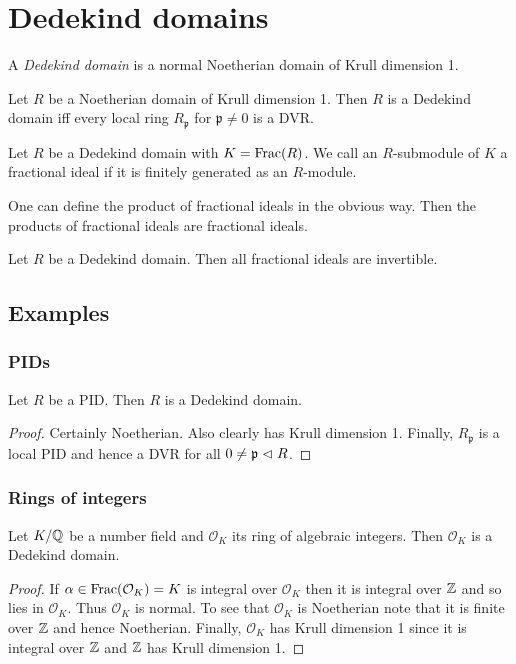 \documentclass{memoir}
\begin{document}
\section{Dedekind domains}
\begin{definition}
    A \textit{Dedekind domain} is a normal Noetherian domain of Krull dimension 1.
\end{definition}
\begin{lemma}
    Let $R$ be a Noetherian domain of Krull dimension 1.
    Then $R$ is a Dedekind domain iff every local ring $R_{\mathfrak p}$ for $\mathfrak p \ne 0$ is a DVR.
\end{lemma}
\begin{definition}
    Let $R$ be a Dedekind domain with $K=\text{Frac}(R)$.
    We call an $R$-submodule of $K$ a fractional ideal if it is finitely generated as an $R$-module.
\end{definition}
\begin{remark}
    One can define the product of fractional ideals in the obvious way.
    Then the products of fractional ideals are fractional ideals.
\end{remark}
\begin{proposition}
    Let $R$ be a Dedekind domain. 
    Then all fractional ideals are invertible.
\end{proposition}
\subsection{Examples}
\subsubsection{PIDs}
\begin{thm}
    Let $R$ be a PID. Then $R$ is a Dedekind domain.
\end{thm}
\begin{proof}
    Certainly Noetherian.
    Also clearly has Krull dimension 1.
    Finally, $R_{\mathfrak p}$ is a local PID and hence a DVR for all $0\ne \mathfrak p\vartriangleleft R$.
\end{proof}
\subsubsection{Rings of integers}
\begin{thm}
    Let $K/\mathbb{Q}$ be a number field and $\mathcal O_K$ its ring of algebraic integers.
    Then $\mathcal O_K$ is a Dedekind domain.
\end{thm}
\begin{proof}
    If $\alpha \in \text{Frac}(\mathcal O_K) = K$ is integral over $\mathcal O_K$ then it is integral over $\mathbb{Z}$ and so lies in $\mathcal O_K$.
    Thus $\mathcal O_K$ is normal.
    To see that $\mathcal O_K$ is Noetherian note that it is finite over $\mathbb{Z}$ and hence Noetherian.
    Finally, $\mathcal O_K$ has Krull dimension 1 since it is integral over $\mathbb{Z}$ and $\mathbb{Z}$ has Krull dimension 1.
\end{proof}
\end{document}
